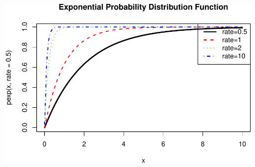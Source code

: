 \documentclass[]{article}
\begin{document}
\includegraphics{probability_files/figure-latex/unnamed-chunk-21-1.pdf}
\end{document}

